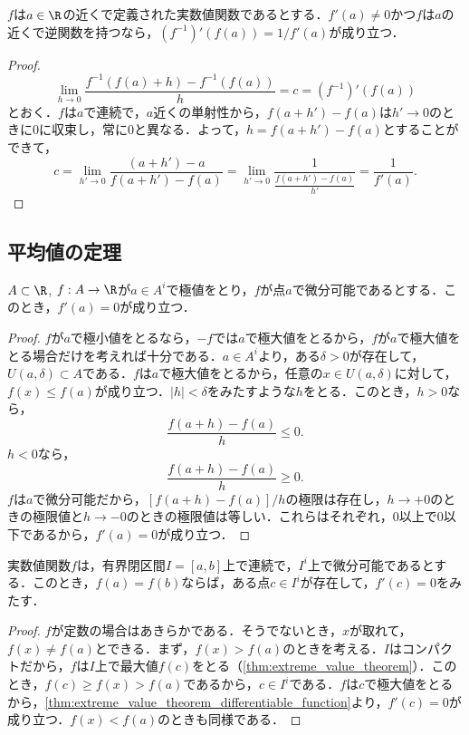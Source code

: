 \documentclass[a4paper,10pt]{ltjsarticle}
\begin{document}
\begin{MyTheorem}
  \(f\)は\(a \in \R\)の近くで定義された実数値関数であるとする．\(f'(a) \ne 0\)かつ\(f\)は\(a\)の近くで逆関数を持つなら，\((f^{-1})'(f(a)) = 1/f'(a)\)が成り立つ．
\end{MyTheorem}
\begin{proof}
  \[ \lim_{h \to 0}\frac{f^{-1}(f(a) + h) - f^{-1}(f(a))}{h} = c = (f^{-1})'(f(a)) \]
  とおく．\(f\)は\(a\)で連続で，\(a\)近くの単射性から，\(f(a + h') - f(a)\)は\(h' \to 0\)のときに\(0\)に収束し，常に\(0\)と異なる．よって，\(h = f(a + h') - f(a)\)とすることができて，
  \[ c = \lim_{h' \to 0} \frac{(a + h') - a}{f(a + h') - f(a)} = \lim_{h' \to 0}\frac{1}{\frac{f(a + h') - f(a)}{h'}} = \frac{1}{f'(a)}. \]
\end{proof}

\subsection{平均値の定理}
\label{sec:mean_value_theorem}

\begin{MyTheorem}
  \(A \subset \R\), \(f: A \to \R\)が\(a \in A^i\)で極値をとり，\(f\)が点\(a\)で微分可能であるとする．このとき，\(f'(a) = 0\)が成り立つ．
\end{MyTheorem}
\begin{proof}
  \(f\)が\(a\)で極小値をとるなら，\(-f\)では\(a\)で極大値をとるから，\(f\)が\(a\)で極大値をとる場合だけを考えれば十分である．\(a \in A^i\)より，ある\(\delta > 0\)が存在して，\(U(a, \delta) \subset A\)である．\(f\)は\(a\)で極大値をとるから，任意の\(x \in U(a, \delta)\)に対して，\(f(x) \le f(a)\)が成り立つ．\(|h| < \delta\)をみたすような\(h\)をとる．このとき，\(h > 0\)なら，
  \[ \frac{f(a+h) - f(a)}{h} \le 0. \]
  \(h < 0\)なら，
  \[ \frac{f(a+h) - f(a)}{h} \ge 0. \]
  \(f\)は\(a\)で微分可能だから，\([f(a + h) - f(a)]/h\)の極限は存在し，\(h \to +0\)のときの極限値と\(h \to -0\)のときの極限値は等しい．これらはそれぞれ，\(0\)以上で\(0\)以下であるから，\(f'(a) = 0\)が成り立つ．
\end{proof}

\begin{MyTheorem}
  実数値関数\(f\)は，有界閉区間\(I=[a, b]\)上で連続で，\(I^i\)上で微分可能であるとする．このとき，\(f(a) = f(b)\)ならば，ある点\(c \in I^i\)が存在して，\(f'(c) = 0\)をみたす．
\end{MyTheorem}
\begin{proof}
  \(f\)が定数の場合はあきらかである．そうでないとき，\(x\)が取れて，\(f(x) \ne f(a)\)とできる．まず，\(f(x) > f(a)\)のときを考える．\(I\)はコンパクトだから，\(f\)は\(I\)上で最大値\(f(c)\)をとる（\cref{thm:extreme_value_theorem}）．このとき，\(f(c) \ge f(x) > f(a)\)であるから，\(c \in I^i\)である．\(f\)は\(c\)で極大値をとるから，\cref{thm:extreme_value_theorem_differentiable_function}より，\(f'(c) = 0\)が成り立つ．\(f(x) < f(a)\)のときも同様である．
\end{proof}
\end{document}
